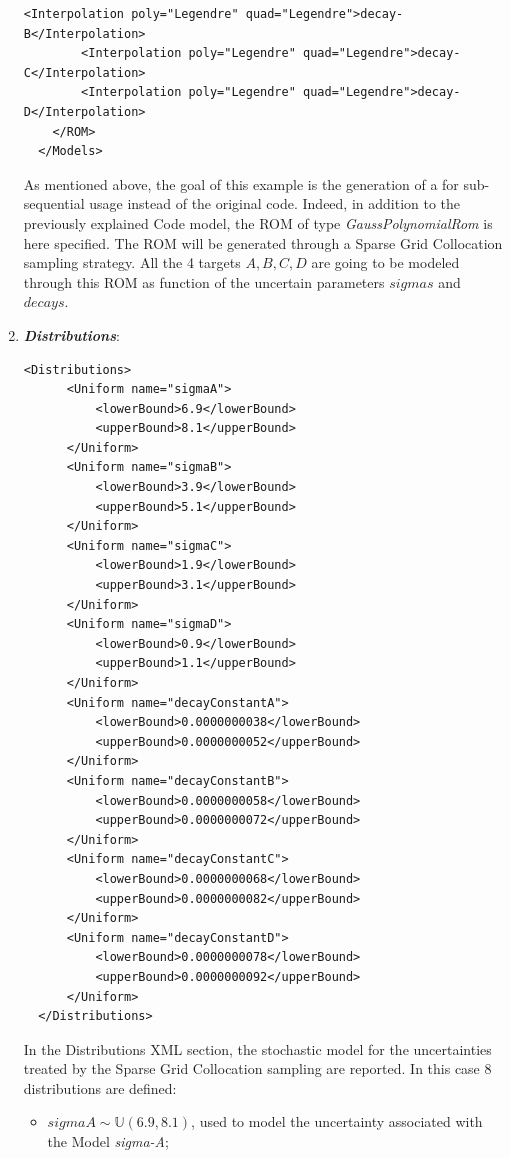 \begin{enumerate}
\begin{lstlisting}[style=XML,morekeywords={arg,extension,pauseAtEnd,overwrite}]
        <Interpolation poly="Legendre" quad="Legendre">decay-B</Interpolation>
        <Interpolation poly="Legendre" quad="Legendre">decay-C</Interpolation>
        <Interpolation poly="Legendre" quad="Legendre">decay-D</Interpolation>
    </ROM>
  </Models>
\end{lstlisting}
 As mentioned above, the goal of this example is the generation of a  
 for sub-sequential usage instead of the original code. Indeed, in addition to the previously explained Code model,
 the ROM of type \textit{GaussPolynomialRom} is here specified. The ROM will be generated through a Sparse Grid
 Collocation sampling strategy. All the 4 targets $A,B,C,D$ are going to be modeled through this ROM as function
 of the uncertain parameters $sigmas$ and $decays$.
   \item \textbf{\textit{Distributions}}:
\begin{lstlisting}[style=XML,morekeywords={arg,extension,pauseAtEnd,overwrite}]
  <Distributions>
      <Uniform name="sigmaA">
          <lowerBound>6.9</lowerBound>
          <upperBound>8.1</upperBound>
      </Uniform>
      <Uniform name="sigmaB">
          <lowerBound>3.9</lowerBound>
          <upperBound>5.1</upperBound>
      </Uniform>
      <Uniform name="sigmaC">
          <lowerBound>1.9</lowerBound>
          <upperBound>3.1</upperBound>
      </Uniform>
      <Uniform name="sigmaD">
          <lowerBound>0.9</lowerBound>
          <upperBound>1.1</upperBound>
      </Uniform>
      <Uniform name="decayConstantA">
          <lowerBound>0.0000000038</lowerBound>
          <upperBound>0.0000000052</upperBound>
      </Uniform>
      <Uniform name="decayConstantB">
          <lowerBound>0.0000000058</lowerBound>
          <upperBound>0.0000000072</upperBound>
      </Uniform>
      <Uniform name="decayConstantC">
          <lowerBound>0.0000000068</lowerBound>
          <upperBound>0.0000000082</upperBound>
      </Uniform>
      <Uniform name="decayConstantD">
          <lowerBound>0.0000000078</lowerBound>
          <upperBound>0.0000000092</upperBound>
      </Uniform>
  </Distributions>
\end{lstlisting}
  In the Distributions XML section, the stochastic model for the 
  uncertainties  treated by the Sparse Grid Collocation sampling are reported. In 
  this case 8 distributions are defined: 
  \begin{itemize}
    \item $sigmaA \sim \mathbb{U}(6.9,8.1)$, used to model the uncertainty 
    associated with  the Model \textit{sigma-A};

\end{itemize}
\end{enumerate}

